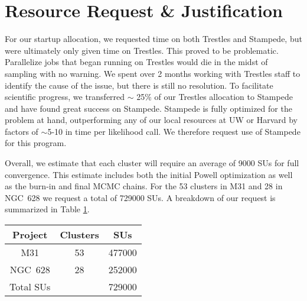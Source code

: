 \documentclass[11pt,preprint]{aastex}
\begin{document}




\section{Resource Request \& Justification}

For our startup allocation, we requested time on both Trestles and Stampede, but were ultimately only given time on Trestles.  This proved to be problematic.  Parallelize jobs that began running on Trestles would die in the midst of sampling with no warning.  We spent over 2 months working with Trestles staff to identify the cause of the issue, but there is still no resolution.  To facilitate scientific progress, we transferred $\sim$ 25\% of our Trestles allocation to Stampede and have found great success on Stampede.  Stampede is fully optimized for the problem at hand, outperforming any of our local resources at UW or Harvard by factors of $\sim$5-10 in time per likelihood call.  We therefore request use of Stampede for this program.

Overall, we estimate that each cluster will require an average of 9000 SUs for full convergence.  This estimate includes both the initial Powell optimization as well as the burn-in and final MCMC chains. For the 53 clusters in M31 and 28 in NGC~628 we request a total of 729000 SUs.  A breakdown of our request is summarized in Table \ref{tab1}.

\begin{table}[h!]
\begin{center}
\begin{tabular}{cc|c}
Project & Clusters & SUs \\
\hline
M31 & 53 & 477000 \\
NGC~628 & 28 & 252000 \\
\hline Total SUs & & 729000 \\
\hline

\end{tabular}
\end{center}
\label{tab1}
\end{table}%
\end{document}
